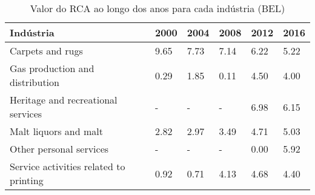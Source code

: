 \begin{table}
\centering
\caption{Valor do RCA ao longo dos anos para cada indústria (BEL)}
\label{tab:ex3-tempo-BEL}
\begin{tabular}{p{6cm}p{1.5cm}p{1.5cm}p{1.5cm}p{1.5cm}p{1.5cm}}
\toprule
                             Indústria & 2000 & 2004 & 2008 & 2012 & 2016 \\
\midrule
                      Carpets and rugs & 9.65 & 7.73 & 7.14 & 6.22 & 5.22 \\
       Gas production and distribution & 0.29 & 1.85 & 0.11 & 4.50 & 4.00 \\
    Heritage and recreational services &    - &    - &    - & 6.98 & 6.15 \\
                 Malt liquors and malt & 2.82 & 2.97 & 3.49 & 4.71 & 5.03 \\
               Other personal services &    - &    - &    - & 0.00 & 5.92 \\
Service activities related to printing & 0.92 & 0.71 & 4.13 & 4.68 & 4.40 \\
\bottomrule
\end{tabular}
\end{table}
